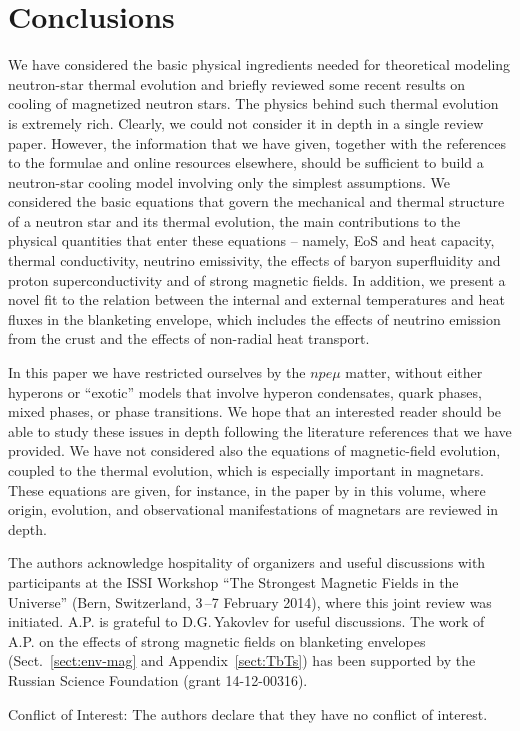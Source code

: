 \documentclass[smallextended]{svjour3}       %
\begin{document}
\section{Conclusions}
\label{sect:concl}

We have considered the basic physical ingredients needed for
theoretical modeling neutron-star thermal evolution and
briefly reviewed some recent results on cooling of
magnetized neutron stars. The physics behind such thermal
evolution is extremely rich. Clearly, we could not consider
it in depth in a single review paper. However, the
information that we have given, together with the references
to the formulae and online resources elsewhere, should be
sufficient to build a neutron-star cooling model involving
only the simplest assumptions. We considered the basic
equations that govern the mechanical and thermal structure
of a neutron star and its thermal evolution, the main
contributions to the physical quantities that enter these
equations -- namely, EoS and heat capacity, thermal
conductivity, neutrino emissivity, the effects of baryon
superfluidity and proton superconductivity and of strong
magnetic fields. In addition, we present a novel fit to
the relation between the internal and external temperatures
and heat fluxes
in the blanketing envelope, which includes the effects
of neutrino emission from the crust and the effects of
non-radial heat transport.

In this paper we have restricted ourselves by the $npe\mu$
matter, without either hyperons or ``exotic'' models that
involve hyperon condensates, quark phases, mixed phases, or
phase transitions. We hope that an interested reader should
be able to study these issues in depth following the
literature references that we have provided. We have not
considered also the equations of magnetic-field evolution,
coupled to the thermal evolution, which is especially
important in magnetars. These equations are given, for
instance, in the paper by \citet{Mereghetti-ea15} in this
volume, where origin, evolution, and observational
manifestations of magnetars are reviewed in depth.

\begin{acknowledgements}
The authors acknowledge hospitality of organizers and useful
discussions with participants at the ISSI Workshop ``The
Strongest Magnetic Fields in the Universe'' (Bern,
Switzerland, 3\,--7 February 2014), where this joint review
was initiated.
A.P.{} is grateful to D.G.\,Yakovlev for useful discussions.
The work of A.P.{} on the effects of strong magnetic fields
on blanketing envelopes (Sect.~\ref{sect:env-mag} and
Appendix~\ref{sect:TbTs}) has been
supported by the Russian Science Foundation (grant
14-12-00316). 

Conflict of Interest: 
The authors declare that they have no conflict of interest.
\end{acknowledgements}
\end{document}
